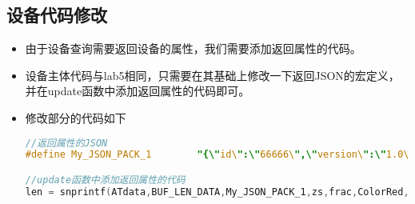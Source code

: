 \documentclass[12pt,hyperref,a4paper,UTF8]{ctexart}
\begin{document}
\subsection*{设备代码修改}
\begin{itemize}
    \item 由于设备查询需要返回设备的属性，我们需要添加返回属性的代码。
    \item 设备主体代码与lab5相同，只需要在其基础上修改一下返回JSON的宏定义，并在update函数中添加返回属性的代码即可。
    \item 修改部分的代码如下
    \begin{lstlisting}[language=C]
//返回属性的JSON
#define My_JSON_PACK_1        "{\"id\":\"66666\",\"version\":\"1.0\",\"method\":\"thing.event.property.post\",\"params\":{\"Temperature\":%d.%02d,\"ColorRed\":%d,\"ColorBlue\":%d,\"ColorGreen\":%d,\"IsFlickering\":%d}}\r"

//update函数中添加返回属性的代码
len = snprintf(ATdata,BUF_LEN_DATA,My_JSON_PACK_1,zs,frac,ColorRed,ColorBlue,ColorGreen,IsFlickering);
    \end{lstlisting}
\end{itemize}
\end{document}
